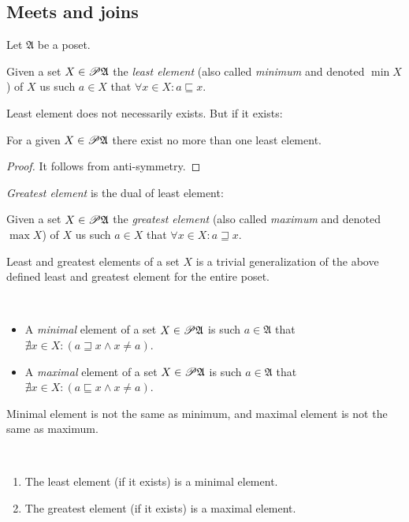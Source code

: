 \subsection{Meets and joins}

Let $\mathfrak{A}$ be a poset.
\begin{defn}
Given a set $X\in\mathscr{P}\mathfrak{A}$ the
\emph{least element} (also called \emph{minimum} and denoted $\min X$)
of $X$ us such $a\in X$ that $\forall x\in X:a\sqsubseteq x$.
\end{defn}
Least element does not necessarily exists. But if it exists:
\begin{prop}
For a given $X\in\mathscr{P}\mathfrak{A}$ there exist no more than one
least element.\end{prop}
\begin{proof}
It follows from anti-symmetry.
\end{proof}
\emph{Greatest element} is the dual of least element:
\begin{defn}
Given a set $X\in\mathscr{P}\mathfrak{A}$ the
\emph{greatest element} (also called \emph{maximum} and denoted $\max X$)
of $X$ us such $a\in X$ that $\forall x\in X:a\sqsupseteq x$.\end{defn}
\begin{rem}
Least and greatest elements of a set $X$ is a trivial generalization
of the above defined least and greatest element for the entire poset.\end{rem}
\begin{defn}
~
\begin{itemize}
\item {}A \emph{minimal} element of a set $X\in\mathscr{P}\mathfrak{A}$
is such $a\in\mathfrak{A}$ that $\nexists x\in X:(a\sqsupseteq x\land x\neq a)$.
\item {}A \emph{maximal} element of a set $X\in\mathscr{P}\mathfrak{A}$
is such $a\in\mathfrak{A}$ that $\nexists x\in X:(a\sqsubseteq x\land x\neq a)$.
\end{itemize}
\end{defn}
\begin{rem}
Minimal element is not the same as minimum, and maximal element is
not the same as maximum.\end{rem}
\begin{obvious}
~
\begin{enumerate}
\item The least element (if it exists) is a minimal element.
\item The greatest element (if it exists) is a maximal element.
\end{enumerate}
\end{obvious}
